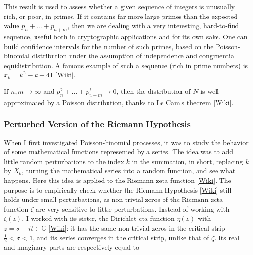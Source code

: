 \documentclass[10pt]{article}
\begin{document}
This result is used to assess whether a given sequence of integers is unusually rich, or poor, in primes. If it contains far more large primes than the
expected value $p_n+\dots+p_{n+m}$, then we are dealing with a very interesting, hard-to-find sequence, useful both in cryptographic applications and for its own sake. One can build confidence intervals for the number of such primes, based on the Poisson-binomial distribution under the assumption of independence and congruential equidistribution. A famous example of such a sequence (rich in prime numbers) is  $x_k=k^2-k+41$ [\href{https://en.wikipedia.org/wiki/Ulam_spiral}{Wiki}].

If $n,m\rightarrow\infty$ and $p_n^2+\dots+p_{n+m}^2\rightarrow 0$, then the distribution of $N$ is well approximated by a Poisson distribution, thanks to Le Cam's theorem
 [\href{https://en.wikipedia.org/wiki/Le_Cam's_theorem}{Wiki}].


\subsubsection{Perturbed Version of the Riemann Hypothesis}\label{rh}

When I first investigated Poisson-binomial processes, it was to study the behavior of some mathematical functions represented by a series. The idea was to add little random perturbations to the index $k$ in the summation, in short, replacing $k$ by $X_k$, turning the mathematical series into a
\textcolor{index}{random function}, and see what happens. Here this idea is applied to the \textcolor{index}{Riemann zeta function} [\href{https://en.wikipedia.org/wiki/Riemann_zeta_function}{Wiki}]. The purpose is to empirically check whether the Riemann Hypothesis
[\href{https://en.wikipedia.org/wiki/Riemann_hypothesis}{Wiki}] still holds under small perturbations, as non-trivial zeros of the Riemann zeta function $\zeta$ are very sensitive to little perturbations. Instead of working with $\zeta(z)$, I worked with its sister, the \textcolor{index}{Dirichlet eta function} $\eta(z)$ with $z=\sigma + it \in \mathbb{C}$
[\href{https://en.wikipedia.org/wiki/Dirichlet_eta_function}{Wiki}]: it has the same non-trivial zeros in the critical strip $\frac{1}{2} < \sigma < 1$, and its series converges in the critical strip, unlike that of $\zeta$. Its real and imaginary parts are respectively equal to
\end{document}
